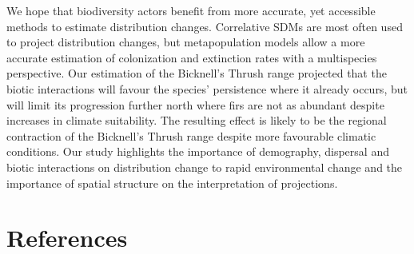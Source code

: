\documentclass[12pt]{article}
\begin{document}
We hope that biodiversity actors benefit from more accurate, yet
accessible methods to estimate distribution changes. Correlative SDMs
are most often used to project distribution changes, but metapopulation
models allow a more accurate estimation of colonization and extinction
rates with a multispecies perspective. Our estimation of the Bicknell's
Thrush range projected that the biotic interactions will favour the
species' persistence where it already occurs, but will limit its
progression further north where firs are not as abundant despite
increases in climate suitability. The resulting effect is likely to be
the regional contraction of the Bicknell's Thrush range despite more
favourable climatic conditions. Our study highlights the importance of
demography, dispersal and biotic interactions on distribution change to
rapid environmental change and the importance of spatial structure on
the interpretation of projections.

\newpage

\hypertarget{references}{%
\section*{References}\label{references}}
\end{document}
